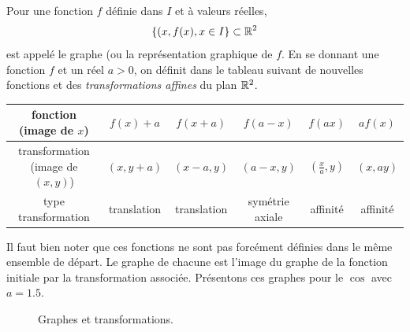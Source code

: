 Pour une fonction $f$ définie dans $I$ et à valeurs réelles, 
\[
 \left\lbrace (x,f(x), x\in I\right\rbrace \subset \mathbb{R}^2
\]
est appelé le graphe (ou la représentation graphique de $f$.\newline
En se donnant une fonction $f$ et un réel $a>0$, on définit dans le tableau suivant de nouvelles fonctions et des \emph{transformations affines}  du plan $\mathbb{R}^2$.  
\begin{center}
\renewcommand{\arraystretch}{1.5}
\begin{tabular}{|c|c|c|c|c|c|} \hline
fonction (image de $x$)& $f(x) +a$ & $ f(x+a)$ & $ f(a-x)$ & $ f(ax)$ & $ af(x)$\\ \hline
transformation (image de $(x,y)$)& $(x,y+a)$ & $(x-a,y)$ & $(a-x,y) $ & $(\frac{x}{a},y)$ & $(x,ay)$\\ \hline
type transformation & translation & translation & symétrie axiale & affinité & affinité \\ \hline
\end{tabular}
\end{center}
Il faut bien noter que ces fonctions ne sont pas forcément définies dans le même ensemble de départ. Le graphe de chacune est l'image du graphe de la fonction initiale par la transformation associée. Présentons ces graphes pour le $\cos$ avec $a=1.5$.
\begin{figure}[h]
  \centering
  \caption{Graphes et transformations.}
\end{figure}



